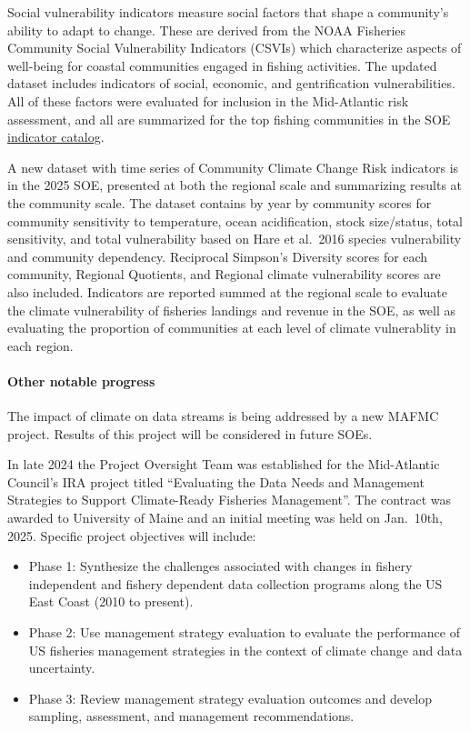 \documentclass[
  10pt,
]{article}
\providecommand{\tightlist}{%
  \setlength{\itemsep}{0pt}\setlength{\parskip}{0pt}}
\begin{document}
Social vulnerability indicators measure social factors that shape a
community's ability to adapt to change. These are derived from the NOAA
Fisheries Community Social Vulnerability Indicators (CSVIs) which
characterize aspects of well-being for coastal communities engaged in
fishing activities. The updated dataset includes indicators of social,
economic, and gentrification vulnerabilities. All of these factors were
evaluated for inclusion in the Mid-Atlantic risk assessment, and all are
summarized for the top fishing communities in the SOE
\href{https://noaa-edab.github.io/catalog/engagement.html}{indicator
catalog}.

A new dataset with time series of Community Climate Change Risk
indicators is in the 2025 SOE, presented at both the regional scale and
summarizing results at the community scale. The dataset contains by year
by community scores for community sensitivity to temperature, ocean
acidification, stock size/status, total sensitivity, and total
vulnerability based on Hare et al.~2016 species vulnerability and
community dependency. Reciprocal Simpson's Diversity scores for each
community, Regional Quotients, and Regional climate vulnerability scores
are also included. Indicators are reported summed at the regional scale
to evaluate the climate vulnerability of fisheries landings and revenue
in the SOE, as well as evaluating the proportion of communities at each
level of climate vulnerablity in each region.

\paragraph{Other notable progress}\label{other-notable-progress}

The impact of climate on data streams is being addressed by a new MAFMC
project. Results of this project will be considered in future SOEs.

In late 2024 the Project Oversight Team was established for the
Mid-Atlantic Council's IRA project titled ``Evaluating the Data Needs
and Management Strategies to Support Climate-Ready Fisheries
Management''. The contract was awarded to University of Maine and an
initial meeting was held on Jan.~10th, 2025. Specific project objectives
will include:

\begin{itemize}
\tightlist
\item
  Phase 1: Synthesize the challenges associated with changes in fishery
  independent and fishery dependent data collection programs along the
  US East Coast (2010 to present).
\item
  Phase 2: Use management strategy evaluation to evaluate the
  performance of US fisheries management strategies in the context of
  climate change and data uncertainty.
\item
  Phase 3: Review management strategy evaluation outcomes and develop
  sampling, assessment, and management recommendations.
\end{itemize}
\end{document}
